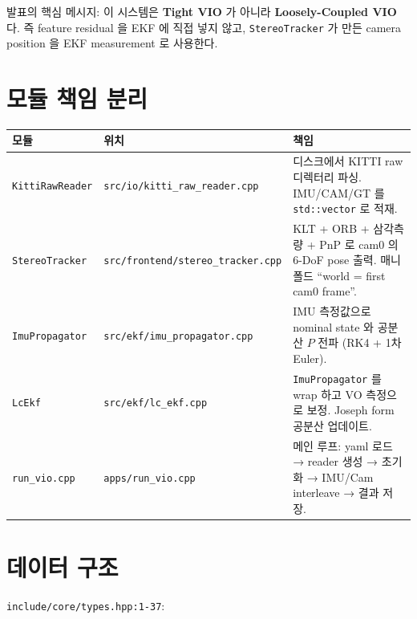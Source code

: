 \documentclass[11pt,a4paper,oneside]{report}
\begin{document}
\begin{notebox}
발표의 핵심 메시지: 이 시스템은 \textbf{Tight VIO} 가 아니라 \textbf{Loosely-Coupled VIO} 다.
즉 feature residual 을 EKF 에 직접 넣지 않고, \texttt{StereoTracker} 가 만든 camera position 을 EKF measurement 로 사용한다.
\end{notebox}

\section{모듈 책임 분리}

\begin{center}\small
\begin{tabular}{p{}p{}p{}}
\toprule
모듈 & 위치 & 책임 \\
\midrule
\texttt{KittiRawReader} & \texttt{src/io/kitti\_raw\_reader.cpp} &
디스크에서 KITTI raw 디렉터리 파싱. IMU/CAM/GT 를 \texttt{std::vector} 로 적재. \\
\addlinespace
\texttt{StereoTracker} & \texttt{src/frontend/stereo\_tracker.cpp} &
KLT + ORB + 삼각측량 + PnP 로 cam0 의 6-DoF pose 출력. 매니폴드 ``world = first cam0 frame''. \\
\addlinespace
\texttt{ImuPropagator} & \texttt{src/ekf/imu\_propagator.cpp} &
IMU 측정값으로 nominal state 와 공분산 \(P\) 전파 (RK4 + 1차 Euler). \\
\addlinespace
\texttt{LcEkf} & \texttt{src/ekf/lc\_ekf.cpp} &
\texttt{ImuPropagator} 를 wrap 하고 VO 측정으로 보정. Joseph form 공분산 업데이트. \\
\addlinespace
\texttt{run\_vio.cpp} & \texttt{apps/run\_vio.cpp} &
메인 루프: yaml 로드 → reader 생성 → 초기화 → IMU/Cam interleave → 결과 저장. \\
\bottomrule
\end{tabular}
\end{center}

\section{데이터 구조}

\texttt{include/core/types.hpp:1-37}:
\end{document}
